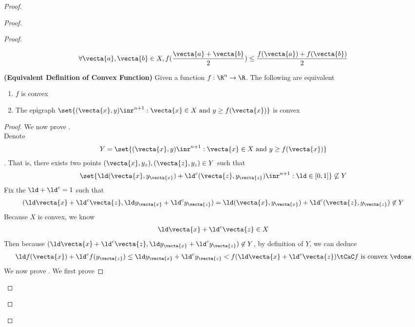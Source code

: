 \documentclass{report}
\begin{document}
\begin{proof}
\begin{proof}
\begin{proof}
\begin{definition}
\begin{align*}
\forall \vecta{a},\vecta{b}\in X, f(\frac{\vecta{a}+\vecta{b}}{2})\leq \frac{f(\vecta{a})+f(\vecta{b})}{2}
\end{align*}
\end{definition}
\begin{theorem}
\label{5.2.6}
\textbf{(Equivalent Definition of Convex Function)} Given a function $f:\R^n\rightarrow \R$. The following are equivalent 
\begin{enumerate}[label=(\alph*)]
  \item $f$ is convex
  \item The epigraph $\set{(\vecta{x},y)\inr^{n+1}:\vecta{x}\in X\text{ and }y\geq f(\vecta{x})}$ is convex 
\end{enumerate}
\end{theorem}
\begin{proof}
We now prove  .\\
 
Denote 
\begin{align*}
Y=\set{(\vecta{x},y)\inr^{n+1}:\vecta{x}\in X\text{ and }y\geq f(\vecta{x})}
\end{align*} 
. That is, there exists two points $(\vecta{x},y_x),(\vecta{z},y_z)\in Y$ such that 
\begin{align*}
\set{\ld (\vecta{x},y_\vecta{x})+\ld ^c(\vecta{z},y_\vecta{z})\inr^{n+1}:\ld  \in [0,1]}\not \subseteq Y
\end{align*}
Fix the $\ld +\ld ^c=1$ such that 
\begin{align*}
  (\ld \vecta{x}+\ld ^c\vecta{z}, \ld y_{\vecta{x}}+\ld ^cy_{\vecta{z}})=\ld (\vecta{x},y_{\vecta{x}})+\ld ^c(\vecta{z},y_{\vecta{z}})\not\in Y
\end{align*}
Because $X$ is convex, we know 
 \begin{align*}
\ld \vecta{x}+\ld ^c\vecta{z} \in X
\end{align*}
Then because $(\ld \vecta{x}+\ld ^c\vecta{z},\ld y_{\vecta{x}}+\ld ^cy_{\vecta{z}})\not\in Y$, by definition of $Y$, we can deduce 
\begin{align*}
\ld f(\vecta{x})+\ld ^c f(y_{\vecta{z}})\leq \ld  y_{\vecta{x}}+\ld ^cy_{\vecta{z}}<f(\ld \vecta{x}+\ld ^c\vecta{z})\tCaC f\text{ is convex }\vdone
\end{align*}
We now prove  . We first prove  


\end{proof}


\end{proof}
\end{proof}
\end{proof}
\end{document}
